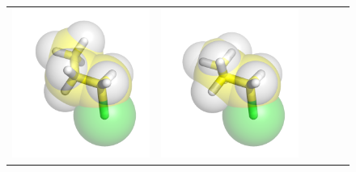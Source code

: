 \documentclass{svmult}
\begin{document}
\begin{figure}
\begin{tabular}{cccccc}
\includegraphics[width=\tmpa]{fig/m003-007} &
\includegraphics[width=\tmpa]{fig/m003-008} & 

\end{tabular}
\end{figure}
\end{document}
